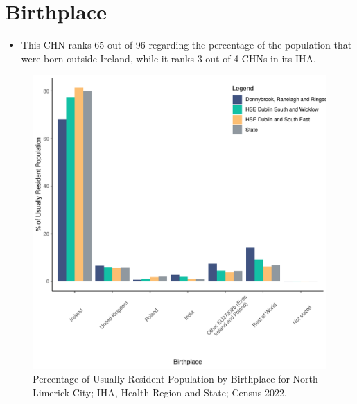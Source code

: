 \documentclass{article}
\begin{document}
\section{Birthplace}\label{sect:Birth}
\begin{itemize}
\item This CHN ranks  65 out of 96 regarding the percentage of the population that were born outside Ireland, while it ranks  3 out of 4 CHNs in its IHA.
\end{itemize}
\begin{figure}[H]
	\centering
	\includegraphics[width = 130mm]{../figures/BirthED.pdf}
	\caption{Percentage of Usually Resident Population by Birthplace for North Limerick City; IHA, Health Region and State; Census 2022.}
	\label{fig:vbnv}
	\end{figure}
	
\end{document}
